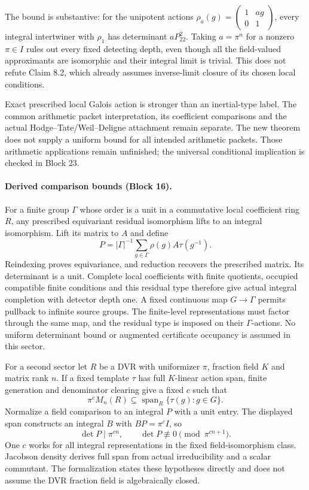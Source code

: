 \documentclass[11pt]{article}
\theoremstyle{definition}
\theoremstyle{remark}
\begin{document}
The bound is substantive: for the unipotent actions
$\rho_a(g)=\begin{pmatrix}1&ag\\0&1\end{pmatrix}$, every integral intertwiner
with $\rho_1$ has determinant $aP_{22}^2$. Taking $a=\pi^n$ for a nonzero
$\pi\in I$ rules out every
fixed detecting depth, even though all the field-valued approximants are
isomorphic and their integral limit is trivial. This does not refute Claim 8.2,
which already assumes inverse-limit closure of its chosen local conditions.

Exact prescribed local Galois action is stronger than an inertial-type label.
The common arithmetic packet interpretation, its coefficient comparisons and
the actual Hodge--Tate/Weil--Deligne attachment remain separate. The new theorem
does not supply a uniform bound for all intended arithmetic packets. Those
arithmetic applications remain unfinished; the universal conditional implication
is checked in Block 23.

\paragraph{Derived comparison bounds (Block 16).}
For a finite group $\Gamma$ whose order is a unit in a commutative local
coefficient ring $R$, any prescribed equivariant residual isomorphism lifts to
an integral isomorphism. Lift its matrix to $A$ and define
\[
P=|\Gamma|^{-1}\sum_{g\in\Gamma}\rho(g)A\tau(g^{-1}).
\]
Reindexing proves equivariance, and reduction recovers the prescribed matrix.
Its determinant is a unit. Complete local coefficients with finite quotients,
occupied compatible finite conditions and this residual type therefore give
actual integral completion with detector depth one. A fixed continuous map
$G\to\Gamma$ permits pullback to infinite source groups. The finite-level
representations must factor through the same map, and the residual type is
imposed on their $\Gamma$-actions. No uniform determinant bound or augmented
certificate occupancy is assumed in this sector.

For a second sector let $R$ be a DVR with uniformizer $\pi$, fraction field $K$
and matrix rank $n$. If a fixed template $\tau$ has full $K$-linear action span,
finite generation and denominator clearing give a fixed $c$ such that
\[
\pi^c M_n(R)\subseteq\operatorname{span}_R\{\tau(g):g\in G\}.
\]
Normalize a field comparison to an integral $P$ with a unit entry. The displayed
span constructs an integral $B$ with $BP=\pi^cI$, so
\[
\det P\mid\pi^{cn},\qquad \det P\not\equiv0\pmod{\pi^{cn+1}}.
\]
One $c$ works for all integral representations in the fixed field-isomorphism
class. Jacobson density derives full span from actual irreducibility and a
scalar commutant. The formalization states these hypotheses directly and does
not assume the DVR fraction field is algebraically closed.
\end{document}
